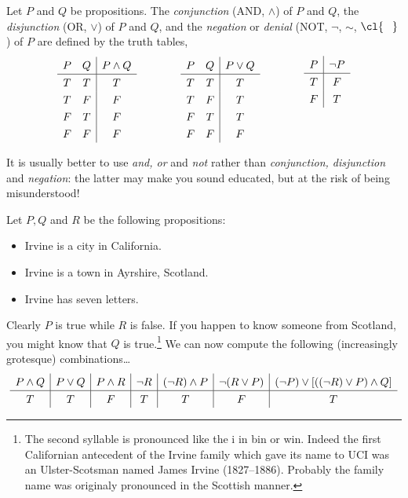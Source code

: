 \begin{defn}
Let $P$ and $Q$ be propositions. The \emph{conjunction} (AND, $\wedge$) of $P$ and $Q$, the \emph{disjunction} (OR, $\vee$) of $P$ and $Q$, and the \emph{negation} or \emph{denial} (NOT, $\neg$, $\sim$, $\cl{\phantom{P}}$) of $P$ are defined by the truth tables,
\[\begin{array}{cc|c}
P & Q & P\wedge Q\\\hline
T & T & T\\
T & F & F\\
F & T & F\\
F & F & F
\end{array}\qquad\qquad
\begin{array}{cc|c}
P & Q & P\vee Q\\\hline
T & T & T\\
T & F & T\\
F & T & T\\
F & F & F
\end{array}\qquad\qquad
\begin{array}[b]{c|c}
P & \neg P\\\hline
T & F\\
F & T
\end{array}\]
\end{defn}

\noindent It is usually better to use \emph{and, or} and \emph{not} rather than \emph{conjunction, disjunction} and \emph{negation}: the latter may make you sound educated, but at the risk of being misunderstood!

\begin{example}
Let $P,Q$ and $R$ be the following propositions:
\begin{itemize}
\item[] Irvine is a city in California.
\item[] Irvine is a town in Ayrshire, Scotland.
\item[] Irvine has seven letters.
\end{itemize}
Clearly $P$ is true while $R$ is false. If you happen to know someone from Scotland, you might know that $Q$ is true.\footnote{The second syllable is pronounced like the i in bin or win. Indeed the first Californian antecedent of the Irvine family which gave its name to UCI was an Ulster-Scotsman named James Irvine (1827--1886). Probably the family name was originaly pronounced in the Scottish manner.} We can now compute the following (increasingly grotesque) combinations\ldots
\[\def\arraystretch{1.3}
\begin{array}{c|c|c|c|c|c|c}
P\wedge Q&P\vee Q&P\wedge R&\neg R&(\neg R)\wedge P&\neg(R\vee P)&(\neg P)\vee [((\neg R)\vee P)\wedge Q] \\\hline
T & T & F & T & T & F & T
\end{array}\]
\end{example}

